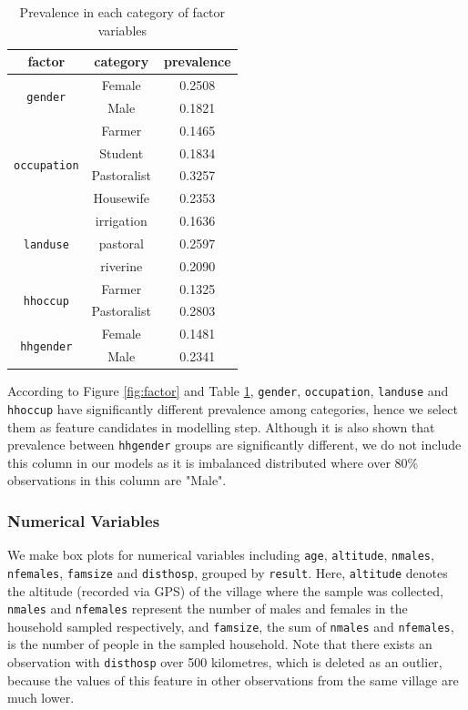 \documentclass[11pt,twoside]{article}
\numberwithin{Theorem}{section}
\numberwithin{Definition}{section}
\numberwithin{Lemma}{section}
\numberwithin{Algorithm}{section}
\numberwithin{equation}{section}
\begin{document}
\begin{table}
	\centering
	\begin{tabular}{|c|c|c|}
		\hline
		factor & category & prevalence \\
		\hline
		\multirow{2}{*}{\texttt{gender}} & Female & 0.2508 \\
		 & Male & 0.1821 \\
		\hline
		\multirow{4}{*}{\texttt{occupation}} & Farmer & 0.1465 \\
		 & Student & 0.1834 \\			
		 & Pastoralist & 0.3257 \\			
		 & Housewife & 0.2353 \\
		\hline
		\multirow{3}{*}{\texttt{landuse}} & irrigation & 0.1636 \\
		 & pastoral & 0.2597 \\
		 & riverine & 0.2090 \\
		\hline
		\multirow{2}{*}{\texttt{hhoccup}} & Farmer & 0.1325 \\
		 & Pastoralist & 0.2803 \\
		\hline
		\multirow{2}{*}{\texttt{hhgender}} & Female & 0.1481 \\
		 & Male & 0.2341 \\
		\hline
	\end{tabular}
	\caption{Prevalence in each category of factor variables}
	\label{tab:factor}
\end{table}

According to Figure \ref{fig:factor} and Table \ref{tab:factor}, \texttt{gender},  \texttt{occupation}, \texttt{landuse} and \texttt{hhoccup} have significantly different prevalence among categories, hence we select them as feature candidates in modelling step. Although it is also shown that prevalence between \texttt{hhgender} groups are significantly different, we do not include this column in our models as it is imbalanced distributed where over 80\% observations in this column are "Male".

\subsubsection{Numerical Variables}

We make box plots for numerical variables including \texttt{age}, \texttt{altitude}, \texttt{nmales}, \texttt{nfemales}, \texttt{famsize} and \texttt{disthosp}, grouped by \texttt{result}. Here, \texttt{altitude} denotes the altitude (recorded via GPS) of the village where the sample was collected, \texttt{nmales} and \texttt{nfemales} represent the number of males and females in the household sampled respectively, and \texttt{famsize}, the sum of \texttt{nmales} and \texttt{nfemales}, is the number of people in the sampled household. Note that there exists an observation with \texttt{disthosp} over 500 kilometres, which is deleted as an outlier, because the values of this feature in other observations from the same village are much lower.
\end{document}
